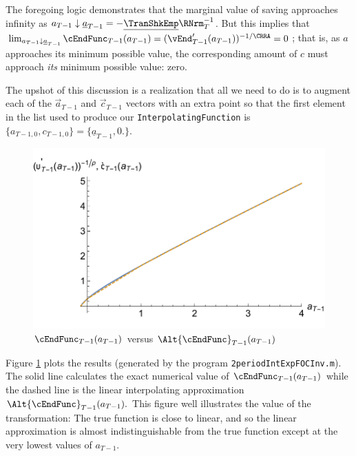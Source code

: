 \documentclass[titlepage, headings=optiontotocandhead]{\econtex}
\begin{document}
The foregoing logic demonstrates that the marginal value of saving approaches infinity as ${a}_{T-1} \downarrow
\underline{a}_{T-1}=-\underline{\TranShkEmp}\RNrm_{T}^{-1}$.  But this
implies that $\lim_{{a}_{T-1} \downarrow \underline{a}_{T-1}}
\cEndFunc_{T-1}({a}_{T-1}) = (\vEnd_{T-1}^{\prime}({a}_{T-1}))^{-1/\CRRA} = 0$;
that is, as ${a}$ approaches its minimum possible value, the
corresponding amount of ${c}$ must approach \textit{its} minimum possible value: zero.

The upshot of this discussion is a realization that all we need to do is to
augment each of the $\vec{a}_{T-1}$ and $\vec{c}_{T-1}$ vectors with an extra point so that the
first element in the list used to produce our \texttt{InterpolatingFunction} is
$\{{a}_{T-1,0},{c}_{T-1,0}\}=\{\underline{a}_{T-1},0.\}$.

\hypertarget{GothVInvVSGothC}{}
\begin{figure}
  \includegraphics{./Figures/GothVInvVSGothC}
  \caption{$\cEndFunc_{T-1}({a}_{T-1})$ versus $\Alt{\cEndFunc}_{T-1}({a}_{T-1})$}
  \label{fig:GothVInvVSGothC}
\end{figure}



Figure
\ref{fig:GothVInvVSGothC} plots the results (generated by the program
\texttt{2periodIntExpFOCInv.m}).
The solid line calculates the exact
numerical value of $\cEndFunc_{T-1}({a}_{T-1})$ while the dashed
line is the linear interpolating approximation
$\Alt{\cEndFunc}_{T-1}({a}_{T-1}).$ This figure well illustrates the
value of the transformation: The
true function is close to linear,
and so the linear approximation is almost indistinguishable from the
true function except at the very lowest values of ${a}_{T-1}$.
\end{document}
